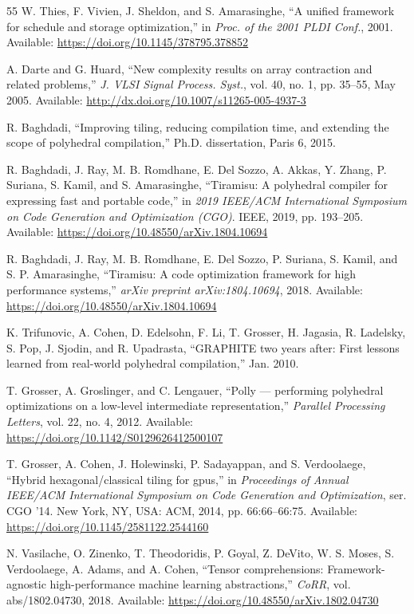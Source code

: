 \documentclass[10pt,twocolumn]{article}
\begin{document}
\begin{thebibliography}{55}
 W. Thies, F. Vivien, J. Sheldon, and S. Amarasinghe, ``A unified framework for schedule and storage optimization,'' in \emph{Proc. of the 2001 PLDI Conf.}, 2001. Available: \url{https://doi.org/10.1145/378795.378852}

 A. Darte and G. Huard, ``New complexity results on array contraction and related problems,'' \emph{J. VLSI Signal Process. Syst.}, vol. 40, no. 1, pp. 35--55, May 2005. Available: \url{http://dx.doi.org/10.1007/s11265-005-4937-3}

 R. Baghdadi, ``Improving tiling, reducing compilation time, and extending the scope of polyhedral compilation,'' Ph.D. dissertation, Paris 6, 2015.

 R. Baghdadi, J. Ray, M. B. Romdhane, E. Del Sozzo, A. Akkas, Y. Zhang, P. Suriana, S. Kamil, and S. Amarasinghe, ``Tiramisu: A polyhedral compiler for expressing fast and portable code,'' in \emph{2019 IEEE/ACM International Symposium on Code Generation and Optimization (CGO)}. IEEE, 2019, pp. 193--205. Available: \url{https://doi.org/10.48550/arXiv.1804.10694}

 R. Baghdadi, J. Ray, M. B. Romdhane, E. Del Sozzo, P. Suriana, S. Kamil, and S. P. Amarasinghe, ``Tiramisu: A code optimization framework for high performance systems,'' \emph{arXiv preprint arXiv:1804.10694}, 2018. Available: \url{https://doi.org/10.48550/arXiv.1804.10694}

 K. Trifunovic, A. Cohen, D. Edelsohn, F. Li, T. Grosser, H. Jagasia, R. Ladelsky, S. Pop, J. Sjodin, and R. Upadrasta, ``GRAPHITE two years after: First lessons learned from real-world polyhedral compilation,'' Jan. 2010.

 T. Grosser, A. Groslinger, and C. Lengauer, ``Polly --- performing polyhedral optimizations on a low-level intermediate representation,'' \emph{Parallel Processing Letters}, vol. 22, no. 4, 2012. Available: \url{https://doi.org/10.1142/S0129626412500107}

 T. Grosser, A. Cohen, J. Holewinski, P. Sadayappan, and S. Verdoolaege, ``Hybrid hexagonal/classical tiling for gpus,'' in \emph{Proceedings of Annual IEEE/ACM International Symposium on Code Generation and Optimization}, ser. CGO '14. New York, NY, USA: ACM, 2014, pp. 66:66--66:75. Available: \url{https://doi.org/10.1145/2581122.2544160}

 N. Vasilache, O. Zinenko, T. Theodoridis, P. Goyal, Z. DeVito, W. S. Moses, S. Verdoolaege, A. Adams, and A. Cohen, ``Tensor comprehensions: Framework-agnostic high-performance machine learning abstractions,'' \emph{CoRR}, vol. abs/1802.04730, 2018. Available: \url{https://doi.org/10.48550/arXiv.1802.04730}


\end{thebibliography}
\end{document}
